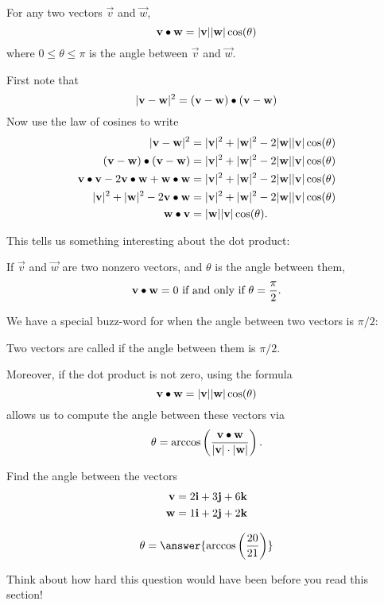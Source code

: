 \documentclass{ximera}
\begin{document}
\begin{theorem}
  For any two vectors $\vec{v}$ and $\vec{w}$,
  \[
  \mathbf{v} \bullet \mathbf{w} = |\mathbf{v}||\mathbf{w}|\cos(\theta)
  \]
  where $0\le \theta\le\pi$ is the angle between $\vec{v}$ and
  $\vec{w}$.
  \begin{explanation}
    First note that
    \[
    |\mathbf{v} - \mathbf{w}|^2 =  (\mathbf{v} - \mathbf{w})\bullet(\mathbf{v} - \mathbf{w})
    \]
    Now use the law of cosines to write
    \begin{align*}
      |\mathbf{v} - \mathbf{w}|^2&=|\mathbf{v}|^2+|\mathbf{w}|^2-2|\mathbf{w}||\mathbf{v}|\cos(\theta)\\
      (\mathbf{v} - \mathbf{w})\bullet(\mathbf{v} - \mathbf{w}) &=|\mathbf{v}|^2+|\mathbf{w}|^2-2|\mathbf{w}||\mathbf{v}|\cos(\theta)\\
      \mathbf{v}\bullet\mathbf{v} -2\mathbf{v}\bullet\mathbf{w}+\mathbf{w}\bullet\mathbf{w}&=|\mathbf{v}|^2+|\mathbf{w}|^2-2|\mathbf{w}||\mathbf{v}|\cos(\theta)\\
      |\mathbf{v}|^2+|\mathbf{w}|^2 -2\mathbf{v}\bullet\mathbf{w} &=|\mathbf{v}|^2+|\mathbf{w}|^2-2|\mathbf{w}||\mathbf{v}|\cos(\theta)\\
      \mathbf{w} \bullet \mathbf{v} &= |\mathbf{w}||\mathbf{v}|\cos(\theta).
    \end{align*}
  \end{explanation}
\end{theorem}
	
This tells us something interesting about the dot product:

\begin{theorem}
  If $\vec{v}$ and $\vec{w}$ are two nonzero vectors, and $\theta$ is
  the angle between them,
  \[
  \mathbf{v}\bullet \mathbf{w} = 0 \text{ if and only if } \theta=
  \frac{\pi}{2}.
  \]
\end{theorem}

We have a special buzz-word for when the angle between two vectors is $\pi/2$:

\begin{definition}
  Two vectors are called  if the angle between them is
  $\pi/2$.
\end{definition}

Moreover, if the dot product is not zero, using the formula
\[
\mathbf{v} \bullet \mathbf{w} = |\mathbf{v}||\mathbf{w}|\cos(\theta)
\]
allows us to compute the angle between these vectors via
\[
\theta = \arccos\left(\frac{\mathbf{v} \bullet \mathbf{w} }{|\mathbf{v}|\cdot|\mathbf{w}|}\right).
\]

\begin{question}
  Find the angle between the vectors
  \begin{align*}
  \mathbf{v} &= 2\mathbf{i}+3\mathbf{j}+6\mathbf{k}\\
  \mathbf{w} &= 1\mathbf{i}+2\mathbf{j}+2\mathbf{k}
  \end{align*}
  \begin{prompt}
  \[
  \theta = \answer{ \arccos\left(\frac{20}{21}\right)}
  \]
  \end{prompt}
  \begin{feedback}
    Think about how hard this question would have been before you read this section!
  \end{feedback}
\end{question}
\end{document}
